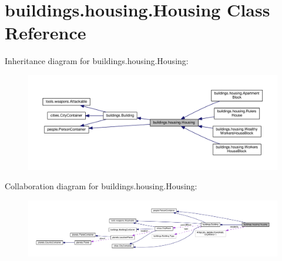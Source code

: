 \hypertarget{classbuildings_1_1housing_1_1_housing}{}\section{buildings.\+housing.\+Housing Class Reference}
\label{classbuildings_1_1housing_1_1_housing}


Inheritance diagram for buildings.\+housing.\+Housing\+:\nopagebreak
\begin{figure}[H]
\begin{center}
\leavevmode
\includegraphics[width=350pt]{classbuildings_1_1housing_1_1_housing__inherit__graph}
\end{center}
\end{figure}


Collaboration diagram for buildings.\+housing.\+Housing\+:\nopagebreak
\begin{figure}[H]
\begin{center}
\leavevmode
\includegraphics[width=350pt]{classbuildings_1_1housing_1_1_housing__coll__graph}
\end{center}
\end{figure}
